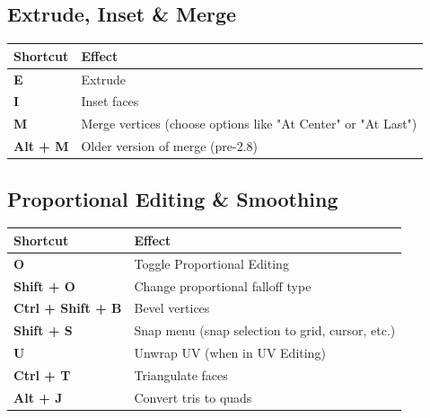 \documentclass{article}
\begin{document}
\subsection{Extrude, Inset \& Merge}

\begin{longtable}{ll}
    \toprule
    \textbf{Shortcut} & \textbf{Effect}                                               \\
    \midrule
    \endhead
    \bottomrule
    \endfoot

    \textbf{E}        & Extrude                                                       \\
    \textbf{I}        & Inset faces                                                   \\
    \textbf{M}        & Merge vertices (choose options like "At Center" or "At Last") \\
    \textbf{Alt + M}  & Older version of merge (pre-2.8)                              \\
\end{longtable}

\subsection{Proportional Editing \& Smoothing}

\begin{longtable}{ll}
    \toprule
    \textbf{Shortcut}         & \textbf{Effect}                                  \\
    \midrule
    \endhead
    \bottomrule
    \endfoot

    \textbf{O}                & Toggle Proportional Editing                      \\
    \textbf{Shift + O}        & Change proportional falloff type                 \\
    \textbf{Ctrl + Shift + B} & Bevel vertices                                   \\
    \textbf{Shift + S}        & Snap menu (snap selection to grid, cursor, etc.) \\
    \textbf{U}                & Unwrap UV (when in UV Editing)                   \\
    \textbf{Ctrl + T}         & Triangulate faces                                \\
    \textbf{Alt + J}          & Convert tris to quads                            \\
\end{longtable}
\end{document}
